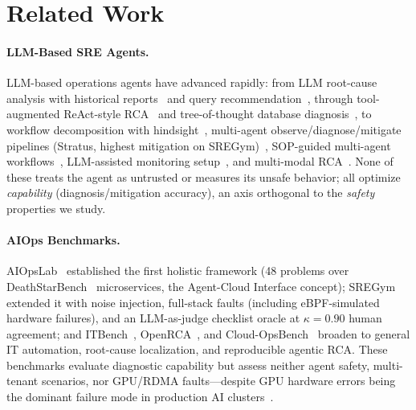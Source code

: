 \documentclass[letterpaper]{article}
\begin{document}
\section{Related Work}

\paragraph{LLM-Based SRE Agents.}
LLM-based operations agents have advanced rapidly: from LLM root-cause analysis with historical reports~\cite{chen2024rcacopilot} and query recommendation~\cite{jiang2024xpert}, through tool-augmented ReAct-style RCA~\cite{wang2024rcagent,yao2023react} and tree-of-thought database diagnosis~\cite{zhou2024dbot}, to workflow decomposition with hindsight~\cite{zhang2024flash}, multi-agent observe/diagnose/mitigate pipelines (Stratus, highest mitigation on SREGym)~\cite{chen2025stratus}, SOP-guided multi-agent workflows~\cite{pei2025flowofaction}, LLM-assisted monitoring setup~\cite{yu2024monitorassistant}, and multi-modal RCA~\cite{zhang2025tamo}.
None of these treats the agent as untrusted or measures its unsafe behavior; all optimize \emph{capability} (diagnosis/mitigation accuracy), an axis orthogonal to the \emph{safety} properties we study.

\paragraph{AIOps Benchmarks.}
AIOpsLab~\cite{chen2025aiopslab} established the first holistic framework (48 problems over DeathStarBench~\cite{gan2019deathstarbench} microservices, the Agent-Cloud Interface concept); SREGym~\cite{clark2026sregym} extended it with noise injection, full-stack faults (including eBPF-simulated hardware failures), and an LLM-as-judge checklist oracle at $\kappa = 0.90$ human agreement; and ITBench~\cite{jha2025itbench}, OpenRCA~\cite{xu2025openrca}, and Cloud-OpsBench~\cite{wang2026cloudopsbench} broaden to general IT automation, root-cause localization, and reproducible agentic RCA.
These benchmarks evaluate diagnostic capability but assess neither agent safety, multi-tenant scenarios, nor GPU/RDMA faults---despite GPU hardware errors being the dominant failure mode in production AI clusters~\cite{cui2025gpuresilience,wan2025byterobust}.
\end{document}
